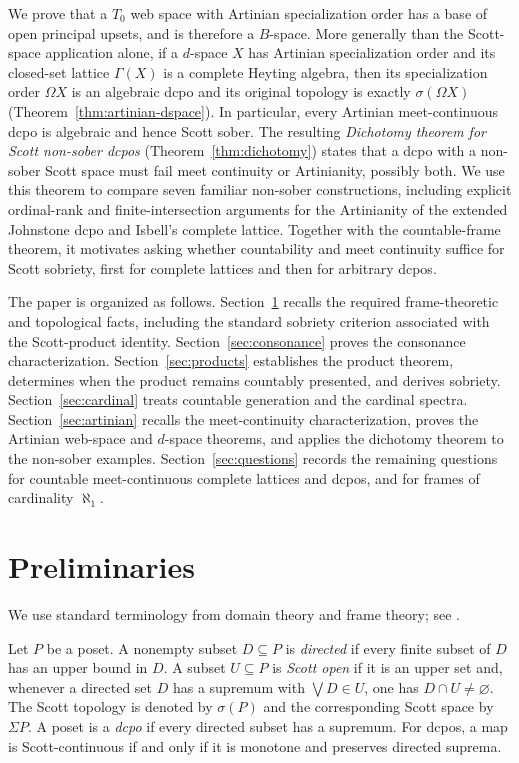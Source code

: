 \documentclass[11pt,reqno]{amsart}
\theoremstyle{definition}
\numberwithin{equation}{section}
\begin{document}
We prove that a $T_0$ web space with Artinian specialization order has a
base of open principal upsets, and is therefore a $B$-space. More
generally than the Scott-space application alone, if a $d$-space $X$ has
Artinian specialization order and its closed-set lattice $\Gamma(X)$ is a
complete Heyting algebra, then its specialization order $\Omega X$ is an
algebraic dcpo and its original topology is exactly $\sigma(\Omega X)$
(Theorem~\ref{thm:artinian-dspace}). In particular, every Artinian
meet-continuous dcpo is algebraic and hence Scott sober. The resulting
\emph{Dichotomy theorem for Scott non-sober dcpos}
(Theorem~\ref{thm:dichotomy}) states that a dcpo with a non-sober Scott
space must fail meet continuity or Artinianity, possibly both. We use this
theorem to compare seven familiar non-sober constructions,
including explicit ordinal-rank and finite-intersection arguments for the
Artinianity of the extended Johnstone dcpo and Isbell's complete lattice. Together with
the countable-frame theorem, it motivates asking whether countability and
meet continuity suffice for Scott sobriety, first for complete lattices
and then for arbitrary dcpos.

The paper is organized as follows. Section~\ref{sec:prelim} recalls the
required frame-theoretic and topological facts, including the standard
sobriety criterion associated with the Scott-product identity.
Section~\ref{sec:consonance} proves the consonance characterization.
Section~\ref{sec:products} establishes the product theorem, determines
when the product remains countably presented, and derives sobriety.
Section~\ref{sec:cardinal} treats countable generation and the cardinal
spectra. Section~\ref{sec:artinian} recalls the meet-continuity
characterization, proves the Artinian web-space and $d$-space theorems,
and applies the dichotomy theorem to the non-sober examples.
Section~\ref{sec:questions} records the remaining questions for countable
meet-continuous complete lattices and dcpos, and for frames of cardinality
$\aleph_1$.

\section{Preliminaries}\label{sec:prelim}

We use standard terminology from domain theory and frame theory; see
\citep{GierzEtAl2003,GoubaultLarrecq2013}.

Let $P$ be a poset.  A nonempty subset $D\subseteq P$ is \emph{directed} if
every finite subset of $D$ has an upper bound in $D$.  A subset $U\subseteq P$
is \emph{Scott open} if it is an upper set and, whenever a directed set $D$
has a supremum with $\bigvee D\in U$, one has $D\cap U\ne\varnothing$.  The
Scott topology is denoted by $\sigma(P)$ and the corresponding Scott space by
$\Sigma P$. A poset is a \emph{dcpo} if every directed subset has a
supremum. For dcpos, a map is Scott-continuous if and only if it is
monotone and preserves directed suprema.
\end{document}
